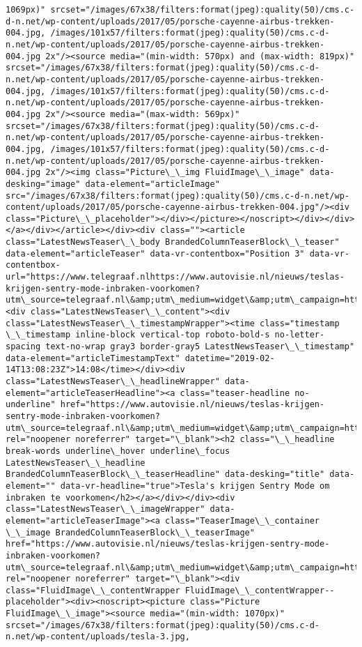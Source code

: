 \documentclass[11pt]{article}
\begin{document}
\begin{Verbatim}[commandchars=\\\{\}]
1069px)" srcset="/images/67x38/filters:format(jpeg):quality(50)/cms.c-d-n.net/wp-content/uploads/2017/05/porsche-cayenne-airbus-trekken-004.jpg, /images/101x57/filters:format(jpeg):quality(50)/cms.c-d-n.net/wp-content/uploads/2017/05/porsche-cayenne-airbus-trekken-004.jpg 2x"/><source media="(min-width: 570px) and (max-width: 819px)" srcset="/images/67x38/filters:format(jpeg):quality(50)/cms.c-d-n.net/wp-content/uploads/2017/05/porsche-cayenne-airbus-trekken-004.jpg, /images/101x57/filters:format(jpeg):quality(50)/cms.c-d-n.net/wp-content/uploads/2017/05/porsche-cayenne-airbus-trekken-004.jpg 2x"/><source media="(max-width: 569px)" srcset="/images/67x38/filters:format(jpeg):quality(50)/cms.c-d-n.net/wp-content/uploads/2017/05/porsche-cayenne-airbus-trekken-004.jpg, /images/101x57/filters:format(jpeg):quality(50)/cms.c-d-n.net/wp-content/uploads/2017/05/porsche-cayenne-airbus-trekken-004.jpg 2x"/><img class="Picture\_\_img FluidImage\_\_image" data-desking="image" data-element="articleImage" src="/images/67x38/filters:format(jpeg):quality(50)/cms.c-d-n.net/wp-content/uploads/2017/05/porsche-cayenne-airbus-trekken-004.jpg"/><div class="Picture\_\_placeholder"></div></picture></noscript></div></div></a></div></article></div><div class=""><article class="LatestNewsTeaser\_\_body BrandedColumnTeaserBlock\_\_teaser" data-element="articleTeaser" data-vr-contentbox="Position 3" data-vr-contentbox-url="https://www.telegraaf.nlhttps://www.autovisie.nl/nieuws/teslas-krijgen-sentry-mode-inbraken-voorkomen?utm\_source=telegraaf.nl\&amp;utm\_medium=widget\&amp;utm\_campaign=https://www.telegraaf.nl/"><div class="LatestNewsTeaser\_\_content"><div class="LatestNewsTeaser\_\_timestampWrapper"><time class="timestamp \_\_timestamp inline-block vertical-top roboto-bold-s no-letter-spacing text-no-wrap gray3 border-gray5 LatestNewsTeaser\_\_timestamp" data-element="articleTimestampText" datetime="2019-02-14T13:08:23Z">14:08</time></div><div class="LatestNewsTeaser\_\_headlineWrapper" data-element="articleTeaserHeadline"><a class="teaser-headline no-underline" href="https://www.autovisie.nl/nieuws/teslas-krijgen-sentry-mode-inbraken-voorkomen?utm\_source=telegraaf.nl\&amp;utm\_medium=widget\&amp;utm\_campaign=https://www.telegraaf.nl/" rel="noopener noreferrer" target="\_blank"><h2 class="\_\_headline break-words underline\_hover underline\_focus LatestNewsTeaser\_\_headline BrandedColumnTeaserBlock\_\_teaserHeadline" data-desking="title" data-element="" data-vr-headline="true">Tesla's krijgen Sentry Mode om inbraken te voorkomen</h2></a></div></div><div class="LatestNewsTeaser\_\_imageWrapper" data-element="articleTeaserImage"><a class="TeaserImage\_\_container \_\_image BrandedColumnTeaserBlock\_\_teaserImage" href="https://www.autovisie.nl/nieuws/teslas-krijgen-sentry-mode-inbraken-voorkomen?utm\_source=telegraaf.nl\&amp;utm\_medium=widget\&amp;utm\_campaign=https://www.telegraaf.nl/" rel="noopener noreferrer" target="\_blank"><div class="FluidImage\_\_contentWrapper FluidImage\_\_contentWrapper--placeholder"><div><noscript><picture class="Picture FluidImage\_\_image"><source media="(min-width: 1070px)" srcset="/images/67x38/filters:format(jpeg):quality(50)/cms.c-d-n.net/wp-content/uploads/tesla-3.jpg, 
\end{Verbatim}
\end{document}
